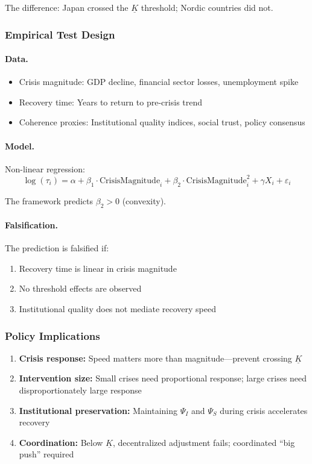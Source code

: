 The difference: Japan crossed the $\underline{K}$ threshold; Nordic countries did not.

\subsubsection{Empirical Test Design}

\paragraph{Data.}
\begin{itemize}
  \item Crisis magnitude: GDP decline, financial sector losses, unemployment spike
  \item Recovery time: Years to return to pre-crisis trend
  \item Coherence proxies: Institutional quality indices, social trust, policy consensus
\end{itemize}

\paragraph{Model.}
Non-linear regression:
\begin{equation}
\log(\tau_i) = \alpha + \beta_1 \cdot \text{CrisisMagnitude}_i + \beta_2 \cdot \text{CrisisMagnitude}_i^2 + \gamma X_i + \varepsilon_i
\end{equation}

The framework predicts $\beta_2 > 0$ (convexity).

\paragraph{Falsification.}
The prediction is falsified if:
\begin{enumerate}
  \item Recovery time is linear in crisis magnitude
  \item No threshold effects are observed
  \item Institutional quality does not mediate recovery speed
\end{enumerate}

\subsubsection{Policy Implications}

\begin{enumerate}
  \item \textbf{Crisis response:} Speed matters more than magnitude---prevent crossing $\underline{K}$
  \item \textbf{Intervention size:} Small crises need proportional response; large crises need disproportionately large response
  \item \textbf{Institutional preservation:} Maintaining $\Psi_I$ and $\Psi_S$ during crisis accelerates recovery
  \item \textbf{Coordination:} Below $\underline{K}$, decentralized adjustment fails; coordinated ``big push'' required
\end{enumerate}

